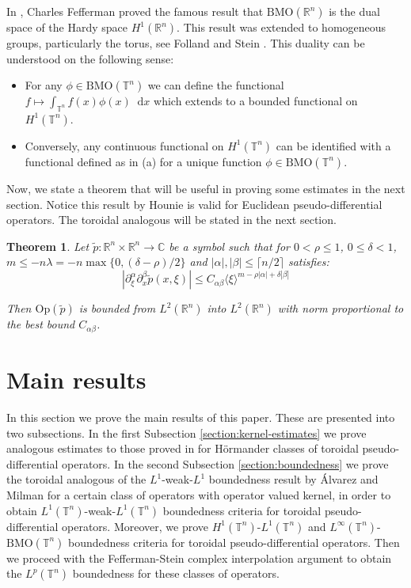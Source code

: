 \documentclass[12pt, reqno]{amsart}
\newtheorem{theorem}{Theorem}[section]
\theoremstyle{definition}
\theoremstyle{remark}
\numberwithin{equation}{section}
\newcommand*\diff{\mathop{}\!\mathrm{d}}
\begin{document}
In \cite{fefferman-BMO}, Charles Fefferman proved the famous result that $\mathrm{BMO}(\mathbb{R}^n)$ is the dual space of the Hardy space $H^1(\mathbb{R}^n)$. This result was extended to homogeneous groups, particularly the torus, see Folland and Stein \cite{folland-stein}. This duality can be understood on the following sense:
\begin{itemize}
    \item[(a)] For any $\phi \in \mathrm{BMO}(\mathbb{T}^n)$ we can define the functional $f\mapsto \int_{\mathbb{T}^n}f(x)\phi(x)\diff x$ which extends to a bounded functional on $H^1(\mathbb{T}^n)$.
    \item[(b)] Conversely, any continuous functional on $H^1(\mathbb{T}^n)$ can be identified with a functional defined as in (a) for a unique function $\phi \in \mathrm{BMO}(\mathbb{T}^n)$.
\end{itemize}

Now, we state a theorem that will be useful in proving some estimates in the next section. Notice this result by Hounie \cite{hounie} is valid for Euclidean pseudo-differential operators. The toroidal analogous will be stated in the next section. 
\begin{theorem}
    Let $\tilde{p}:\mathbb{R}^n \times \mathbb{R}^n \rightarrow \mathbb{C}$ be a symbol such that for $0<\rho\leq1$, $0\leq \delta < 1$, $m\leq -n \lambda = -n\max\{0, (\delta - \rho)/2\}$ and $|\alpha|,|\beta| \leq \lceil n/2\rceil$ satisfies: 
    \begin{equation}
        \left|\partial^\alpha_\xi \partial^\beta_x \tilde{p}(x, \xi)\right| \leq C_{\alpha\beta}\langle\xi\rangle^{m-\rho|\alpha| + \delta|\beta|}
    \end{equation}

    Then $\mathrm{Op}(\tilde{p})$ is bounded from $L^2(\mathbb{R}^n)$ into $L^2(\mathbb{R}^n)$ with norm proportional to the best bound $C_{\alpha\beta}$.
    \label{theo:22boundR}
\end{theorem}

\section{Main results}
\label{section:main}
In this section we prove the main results of this paper. These are presented into two subsections.
In the first Subsection \ref{section:kernel-estimates} we prove analogous estimates to those proved in \cite[Sections~1 and 2]{alvarez-hounie} for Hörmander classes of toroidal pseudo-differential operators. In the second Subsection \ref{section:boundedness} we prove the toroidal analogous of the $L^1$-weak-$L^1$ boundedness result by \'Alvarez and Milman \cite[Theorem 4.1]{alvarez-milman} for a certain class of operators with operator valued kernel, in order to obtain  $L^1(\mathbb{T}^n)$-weak-$L^1(\mathbb{T}^n)$ boundedness criteria for toroidal pseudo-differential operators. Moreover, we prove $H^1(\mathbb{T}^n)$-$L^1(\mathbb{T}^n)$ and $L^\infty(\mathbb{T}^n)$-$\mathrm{BMO}(\mathbb{T}^n)$ boundedness criteria for toroidal pseudo-differential operators. Then we proceed with the Fefferman-Stein complex interpolation argument to obtain the $L^p(\mathbb{T}^n)$ boundedness for these classes of operators.
\end{document}
